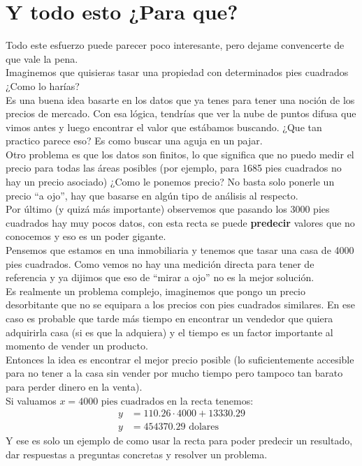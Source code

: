 \documentclass{article}
\begin{document}
\section{Y todo esto ¿Para que?}
Todo este esfuerzo puede parecer poco interesante, pero dejame convencerte de que vale la pena.\\
Imaginemos que quisieras tasar una propiedad con determinados pies cuadrados ¿Como lo harías?\\
Es una buena idea basarte en los datos que ya tenes para tener una noción de los precios de mercado. Con esa lógica, tendrías que ver la nube de puntos difusa que vimos antes y luego encontrar el valor que estábamos buscando. ¿Que tan practico parece eso? Es como buscar una aguja en un pajar.\\
Otro problema es que los datos son finitos, lo que significa que no puedo medir el precio para todas las áreas posibles (por ejemplo, para 1685 pies cuadrados no hay un precio asociado) ¿Como le ponemos precio? No basta solo ponerle un precio ``a ojo”, hay que basarse en algún tipo de análisis al respecto.\\
Por último (y quizá más importante) observemos que pasando los 3000 pies cuadrados hay muy pocos datos, con esta recta se puede \textbf{predecir} valores que no conocemos y eso es un poder gigante.\\
Pensemos que estamos en una inmobiliaria y tenemos que tasar una casa de 4000 pies cuadrados. Como vemos no hay una medición directa para tener de referencia y ya dijimos que eso de
``mirar a ojo” no es la mejor solución.\\
Es realmente un problema complejo, imaginemos que pongo un precio desorbitante que no se equipara a los precios con pies cuadrados similares. En ese caso es probable que tarde más tiempo en encontrar un vendedor que quiera adquirirla casa (si es que la adquiera) y el tiempo es un factor importante al momento de vender un producto.\\
Entonces la idea es encontrar el mejor precio posible (lo suficientemente accesible para no tener a la casa sin vender por mucho tiempo pero tampoco tan barato para perder dinero en la venta).\\
Si valuamos $x=4000 \text{ pies cuadrados}$ en la recta tenemos:
\begin{equation*}
    \begin{split}
        y&=110.26\cdot 4000+13330.29\\
        y&=454370.29 \text{ dolares}
    \end{split}
\end{equation*}
Y ese es solo un ejemplo de como usar la recta para poder predecir un resultado, dar respuestas a preguntas concretas y resolver un problema.
\end{document}
